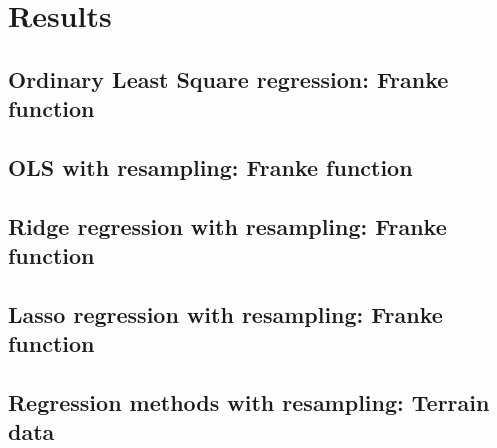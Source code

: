 \section{Results}

\subsection{Ordinary Least Square regression: Franke function}



\subsection{OLS with resampling: Franke function}

\subsection{Ridge regression with resampling: Franke function}

\subsection{Lasso regression with resampling: Franke function}



\subsection{Regression methods with resampling: Terrain data}
